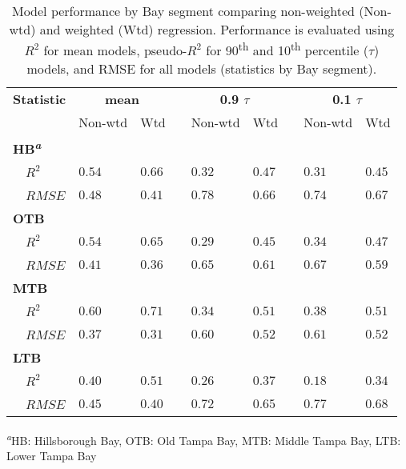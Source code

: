 \documentclass{svjour3}\usepackage[]{graphicx}\usepackage[]{color}
\newcommand{\ten}{10\textsuperscript{th} percentile }
\begin{document}
%
\begin{table}[!tbp]
\caption{Model performance by Bay segment comparing non-weighted (Non-wtd) and weighted (Wtd) regression.  Performance is evaluated using $R^2$ for mean models, pseudo-$R^2$ for 90\textsuperscript{th} and \ten ($\tau$) models, and \ac{RMSE} for all models (statistics by Bay segment).\label{tab:modperf}} 
\begin{center}
\begin{tabular}{lllcllcll}
\hline\hline
\multicolumn{1}{l}{\bfseries Statistic}&\multicolumn{2}{c}{\bfseries mean}&\multicolumn{1}{c}{\bfseries }&\multicolumn{2}{c}{\bfseries 0.9 $\tau$}&\multicolumn{1}{c}{\bfseries }&\multicolumn{2}{c}{\bfseries 0.1 $\tau$}\tabularnewline
\cline{2-3} \cline{5-6} \cline{8-9}
\multicolumn{1}{l}{}&\multicolumn{1}{c}{Non-wtd}&\multicolumn{1}{c}{Wtd}&\multicolumn{1}{c}{}&\multicolumn{1}{c}{Non-wtd}&\multicolumn{1}{c}{Wtd}&\multicolumn{1}{c}{}&\multicolumn{1}{c}{Non-wtd}&\multicolumn{1}{c}{Wtd}\tabularnewline
\hline
{\bfseries HB\textsuperscript{\textit{a}}}&&&&&&&&\tabularnewline
~~$R^2$&$0.54$&$0.66$&&$0.32$&$0.47$&&$0.31$&$0.45$\tabularnewline
~~$RMSE$&$0.48$&$0.41$&&$0.78$&$0.66$&&$0.74$&$0.67$\tabularnewline
\hline
{\bfseries OTB}&&&&&&&&\tabularnewline
~~$R^2$&$0.54$&$0.65$&&$0.29$&$0.45$&&$0.34$&$0.47$\tabularnewline
~~$RMSE$&$0.41$&$0.36$&&$0.65$&$0.61$&&$0.67$&$0.59$\tabularnewline
\hline
{\bfseries MTB}&&&&&&&&\tabularnewline
~~$R^2$&$0.60$&$0.71$&&$0.34$&$0.51$&&$0.38$&$0.51$\tabularnewline
~~$RMSE$&$0.37$&$0.31$&&$0.60$&$0.52$&&$0.61$&$0.52$\tabularnewline
\hline
{\bfseries LTB}&&&&&&&&\tabularnewline
~~$R^2$&$0.40$&$0.51$&&$0.26$&$0.37$&&$0.18$&$0.34$\tabularnewline
~~$RMSE$&$0.45$&$0.40$&&$0.72$&$0.65$&&$0.77$&$0.68$\tabularnewline
\hline
\end{tabular}
\end{center}
\footnotesize \textsuperscript{\textit{a}}HB: Hillsborough Bay, OTB: Old Tampa Bay, MTB: Middle Tampa Bay, LTB: Lower Tampa Bay\end{table}
\end{document}
